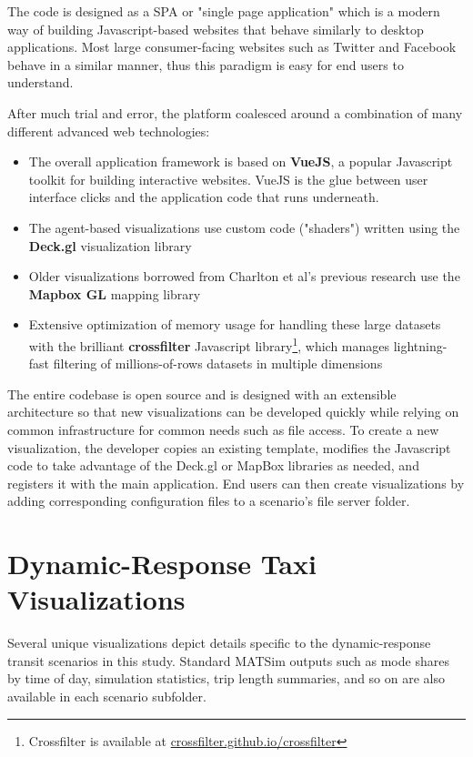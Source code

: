 The code is designed as a \gls{SPA} or "single page application" which is a modern way of building Javascript-based websites that behave similarly to desktop applications. Most large consumer-facing websites such as Twitter and Facebook behave in a similar manner, thus this paradigm is easy for end users to understand.

After much trial and error, the platform coalesced around a combination of many different advanced web technologies:

\begin{itemize}
  \item The overall application framework is based on \textbf{VueJS}, a popular Javascript toolkit for building interactive websites. VueJS is the glue between user interface clicks and the application code that runs underneath.
  \item The agent-based visualizations use custom code ("shaders") written using the \textbf{Deck.gl} visualization library
  \item Older visualizations borrowed from Charlton et al's previous research use the \textbf{Mapbox GL} mapping library
  \item Extensive optimization of memory usage for handling these large datasets with the brilliant \textbf{crossfilter} Javascript library\footnote{Crossfilter is available at \href{https://crossfilter.github.io/crossfilter/}{crossfilter.github.io/crossfilter}}, which manages lightning-fast filtering of millions-of-rows datasets in multiple dimensions
\end{itemize}

The entire codebase is open source and is designed with an extensible architecture so that new visualizations can be developed quickly while relying on common infrastructure for common needs such as file access. To create a new visualization, the developer copies an existing template, modifies the Javascript code to take advantage of the Deck.gl or MapBox libraries as needed, and registers it with the main application. End users can then create visualizations by adding corresponding configuration files to a scenario's file server folder.

\section{Dynamic-Response Taxi Visualizations}
\label{avov-drtviz}

Several unique visualizations depict details specific to the dynamic-response transit scenarios in this study. Standard MATSim outputs such as mode shares by time of day, simulation statistics, trip length summaries, and so on are also available in each scenario subfolder.

